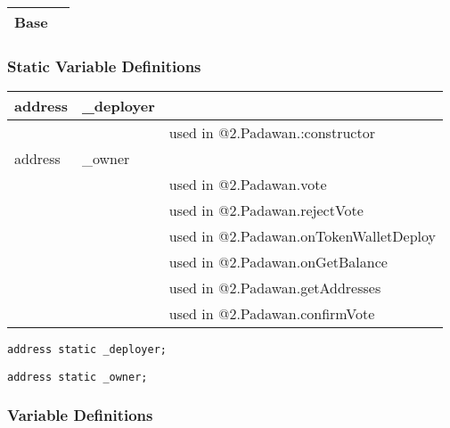 \noindent\begin{tabular}{|l|p{5cm}|}\hline
Base & \\\hline
\end{tabular}


\subsubsection{Static Variable Definitions}


\ifsoltables
\noindent\begin{tabular}{|l|l|p{5cm}|}\hline
address & \_{}deployer &  \\\hline
 & & used in @2.Padawan.:constructor\\\hline
address & \_{}owner &  \\\hline
 & & used in @2.Padawan.vote\\\hline
 & & used in @2.Padawan.rejectVote\\\hline
 & & used in @2.Padawan.onTokenWalletDeploy\\\hline
 & & used in @2.Padawan.onGetBalance\\\hline
 & & used in @2.Padawan.getAddresses\\\hline
 & & used in @2.Padawan.confirmVote\\\hline
\end{tabular}
\fi


\begin{lstlisting}[firstnumber=18]
    address static _deployer;
\end{lstlisting}

\begin{lstlisting}[firstnumber=19]
    address static _owner;
\end{lstlisting}

\subsubsection{Variable Definitions}


